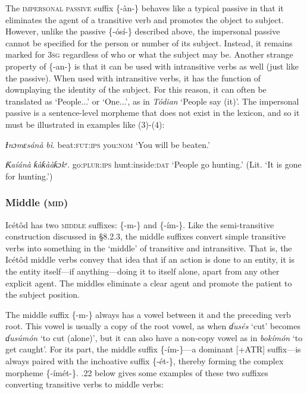 The \textsc{impersonal passive} suffix \{-àn-\} behaves like a typical passive in that it eliminates the agent of a transitive verb and promotes the object to subject. However, unlike the passive \{-ósí-\} described above, the impersonal passive cannot be specified for the person or number of its subject. Instead, it remains marked for 3\textsc{sg} regardless of who or what the subject may be. Another strange property of \{-an-\} is that it can be used with intransitive verbs as well (just like the passive). When used with intransitive verbs, it has the function of downplaying the identity of the subject. For this reason, it can often be translated as ‘People...’ or ‘One...’, as in \textit{Tódian} ‘People say (it)’. The impersonal passive is a sentence-level morpheme that does not exist in the lexicon, and so it must be illustrated in examples like (3)-(4):




\textit{Ɨnɔmɛs}\textit{án}\textit{à}   \textit{bì}.
beat:\textsc{fut:ips}  you:\textsc{nom}
‘You will be beaten.’




\textit{Ƙaí}\textit{án}\textit{à}   \textit{ƙàƙààƙɔkᵋ.}
go:\textsc{plur:ips} hunt:inside:\textsc{dat}
‘People go hunting.’ (Lit. ‘It is gone for hunting.’)




\subsubsection{Middle (\textsc{mid})}

Icétôd has two \textsc{middle} suffixes: \{-m-\} and \{-ím-\}. Like the semi-transitive construction discussed in §8.2.3, the middle suffixes convert simple transitive verbs into something in the ‘middle’ of transitive and intransitive. That is, the Icétôd middle verbs convey that idea that if an action is done to an entity, it is the entity itself—if anything—doing it to itself alone, apart from any other explicit agent. The middles eliminate a clear agent and promote the patient to the subject position. 

The middle suffix \{-m-\} always has a vowel between it and the preceding verb root. This vowel is usually a copy of the root vowel, as when \textit{ɗusés} ‘cut’ becomes \textit{ɗusúmón} ‘to cut (alone)’, but it can also have a non-copy vowel as in \textit{bokímón} ‘to get caught’. For its part, the middle suffix \{-ím-\}—a dominant [+ATR] suffix—is always paired with the inchoative suffix \{-ét-\}, thereby forming the complex morpheme \{-ímét-\}. .22 below gives some examples of these two suffixes converting transitive verbs to middle verbs:


